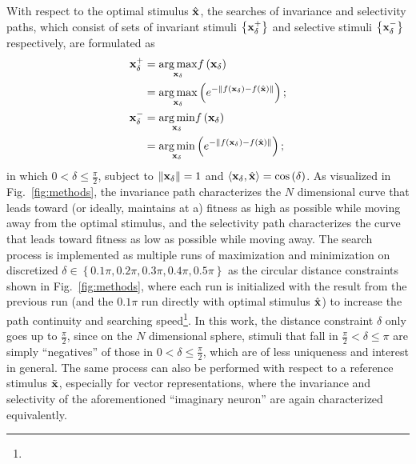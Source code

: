 \documentclass[10pt,twocolumn,letterpaper]{article}
\begin{document}
With respect to the optimal stimulus $\hat{\bf{x}}$, the searches of invariance and selectivity paths, which consist of sets of invariant stimuli $\left\lbrace \bf{x}^{+}_{\delta} \right\rbrace$ and selective stimuli $\left\lbrace \bf{x}^{-}_{\delta} \right\rbrace$ respectively, are formulated as
\begin{align}
\bf{x}^{+}_{\delta} &= \underset{\bf{x}_{\delta}}{\arg\max} f\left(\bf{x}_{\delta}\right) \label{eq:I1} \\
&= \underset{\bf{x}_{\delta}}{\arg\max} \left( e^{-\left\|f\left(\bf{x}_{\delta}\right)-f\left(\hat{\bf{x}}\right)\right\|} \right); \label{eq:I2} \\
\bf{x}^{-}_{\delta} &= \underset{\bf{x}_{\delta}}{\arg\min} f\left(\bf{x}_{\delta}\right) \label{eq:S1} \\
&= \underset{\bf{x}_{\delta}}{\arg\min} \left( e^{-\left\|f\left(\bf{x}_{\delta}\right)-f\left(\hat{\bf{x}}\right)\right\|} \right); \label{eq:S2}
\end{align}
in which $0 < \delta \le \frac{\pi}{2}$, subject to $\left\| \bf{x}_{\delta} \right\| = 1$ and $\langle {\bf{x}}_{\delta} , \hat{{\bf{x}}} \rangle = \cos\left(\delta\right)$. 
As visualized in Fig.~\ref{fig:methods}, the invariance path characterizes the $N$ dimensional curve that leads toward (or ideally, maintains at a) fitness as high as possible while moving away from the optimal stimulus, and the selectivity path characterizes the curve that leads toward fitness as low as possible while moving away.
The search process is implemented as multiple runs of maximization and minimization on discretized $\delta \in \left\lbrace 0.1\pi, 0.2\pi, 0.3\pi, 0.4\pi, 0.5\pi\right\rbrace$ as the circular distance constraints shown in Fig.~\ref{fig:methods}, where each run is initialized with the result from the previous run (and the $0.1\pi$ run directly with optimal stimulus $\hat{\bf{x}}$) to increase the path continuity and searching speed\footnote{\expdiff}.
In this work, the distance constraint $\delta$ only goes up to $\frac{\pi}{2}$, since on the $N$ dimensional sphere, stimuli that fall in $\frac{\pi}{2} < \delta \le \pi$ are simply ``negatives'' of those in $0 < \delta \le \frac{\pi}{2}$, which are of less uniqueness and interest in general. 
The same process can also be performed with respect to a reference stimulus $\tilde{\bf{x}}$, especially for vector representations, where the invariance and selectivity of the aforementioned ``imaginary neuron'' are again characterized equivalently.

\end{document}
